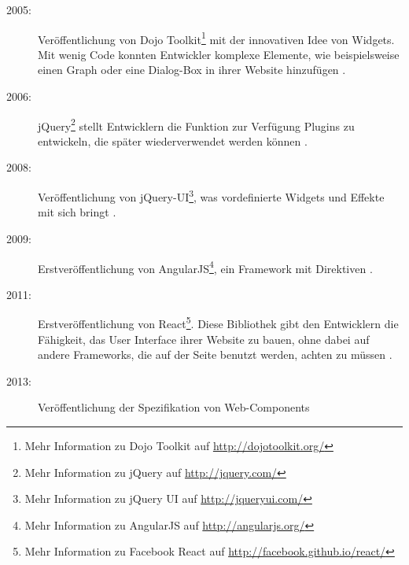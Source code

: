 \begin{description}
\item[2005:] Veröffentlichung von Dojo Toolkit\footnote{Mehr Information zu Dojo Toolkit auf \href{http://dojotoolkit.org/}{http://dojotoolkit.org/}} mit der innovativen Idee von Widgets. Mit wenig Code konnten Entwickler komplexe Elemente, wie beispielsweise einen Graph oder eine Dialog-Box in ihrer Website hinzufügen \citereset \autocite[siehe][]{Dojo.2005}.
\item[2006:] jQuery\footnote{Mehr Information zu jQuery auf \href{http://jquery.com/}{http://jquery.com/}} stellt Entwicklern die Funktion zur Verfügung Plugins zu entwickeln, die später wiederverwendet werden können \citereset \autocite[siehe][]{jQuery}.
\item[2008:] Veröffentlichung von jQuery-UI\footnote{Mehr Information zu jQuery UI auf \href{http://jqueryui.com/}{http://jqueryui.com/}}, was vordefinierte Widgets und Effekte mit sich bringt \citereset \autocite[siehe][]{jQueryUI}.
\item[2009:] Erstveröffentlichung von AngularJS\footnote{Mehr Information zu AngularJS auf \href{http://angularjs.org/}{http://angularjs.org/}}, ein Framework mit Direktiven \citereset \autocite[siehe][]{AngularJS}.
\item[2011:] Erstveröffentlichung von React\footnote{Mehr Information zu Facebook React auf \href{http://facebook.github.io/react/}{http://facebook.github.io/react/}}. Diese Bibliothek gibt den Entwicklern die Fähigkeit, das User Interface ihrer Website zu bauen, ohne dabei auf andere Frameworks, die auf der Seite benutzt werden, achten zu müssen \citereset \autocite[siehe][]{Facebook}.
\item[2013:] Veröffentlichung der Spezifikation von Web-Components \citereset \autocite[siehe][]{CooneyGlazkov.2013}
\end{description}

